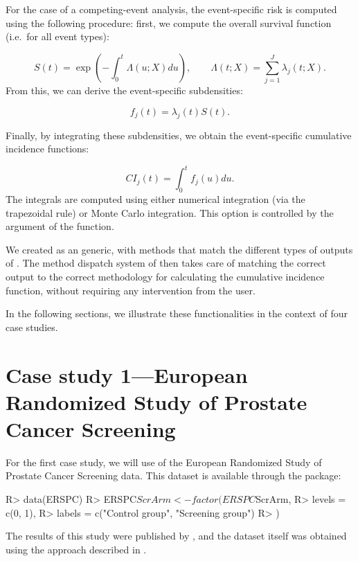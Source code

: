 \documentclass[
]{jss}
\begin{document}
For the case of a competing-event analysis, the event-specific risk is
computed using the following procedure: first, we compute the overall
survival function (i.e.~for all event types):

\[ S(t) = \exp\left(-\int_0^t \Lambda(u;X) du\right),\qquad \Lambda(t;X) = \sum_{j=1}^J \lambda_j(t;X).\]
From this, we can derive the event-specific subdensities:

\[ f_j(t) = \lambda_j(t)S(t).\]

Finally, by integrating these subdensities, we obtain the event-specific
cumulative incidence functions:

\[ CI_j(t) = \int_0^t f_j(u)du.\] The integrals are computed using
either numerical integration (via the trapezoidal rule) or Monte Carlo
integration. This option is controlled by the argument  of
the  function.

We created  as an  generic, with methods
that match the different types of outputs of . The
method dispatch system of  then takes care of matching the
correct output to the correct methodology for calculating the cumulative
incidence function, without requiring any intervention from the user.

In the following sections, we illustrate these functionalities in the
context of four case studies.

\hypertarget{case-study-1european-randomized-study-of-prostate-cancer-screening}{%
\section{Case study 1---European Randomized Study of Prostate Cancer
Screening}\label{case-study-1european-randomized-study-of-prostate-cancer-screening}}

For the first case study, we will use of the European Randomized Study
of Prostate Cancer Screening data. This dataset is available through the
 package:

\begin{CodeChunk}

\begin{CodeInput}
R> data(ERSPC)
R> ERSPC$ScrArm <- factor(ERSPC$ScrArm,
R>   levels = c(0, 1),
R>   labels = c("Control group", "Screening group")
R> )
\end{CodeInput}
\end{CodeChunk}

The results of this study were published by
\citep{schroder2009screening}, and the dataset itself was obtained using
the approach described in \citep{liu2014recovering}.
\end{document}
